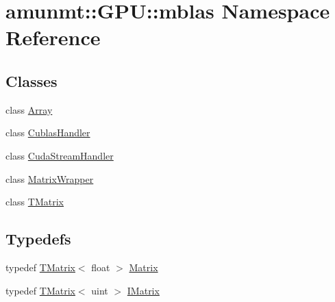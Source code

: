 \hypertarget{namespaceamunmt_1_1GPU_1_1mblas}{}\section{amunmt\+:\+:G\+PU\+:\+:mblas Namespace Reference}
\label{namespaceamunmt_1_1GPU_1_1mblas}
\subsection*{Classes}
\begin{DoxyCompactItemize}
\item 
class \hyperlink{classamunmt_1_1GPU_1_1mblas_1_1Array}{Array}
\item 
class \hyperlink{classamunmt_1_1GPU_1_1mblas_1_1CublasHandler}{Cublas\+Handler}
\item 
class \hyperlink{classamunmt_1_1GPU_1_1mblas_1_1CudaStreamHandler}{Cuda\+Stream\+Handler}
\item 
class \hyperlink{classamunmt_1_1GPU_1_1mblas_1_1MatrixWrapper}{Matrix\+Wrapper}
\item 
class \hyperlink{classamunmt_1_1GPU_1_1mblas_1_1TMatrix}{T\+Matrix}
\end{DoxyCompactItemize}
\subsection*{Typedefs}
\begin{DoxyCompactItemize}
\item 
typedef \hyperlink{classamunmt_1_1GPU_1_1mblas_1_1TMatrix}{T\+Matrix}$<$ float $>$ \hyperlink{namespaceamunmt_1_1GPU_1_1mblas_ab67821a8254de53e45a623cf73c0aef6}{Matrix}
\item 
typedef \hyperlink{classamunmt_1_1GPU_1_1mblas_1_1TMatrix}{T\+Matrix}$<$ uint $>$ \hyperlink{namespaceamunmt_1_1GPU_1_1mblas_ad6a337d269d1833a6028b8871e57d2d0}{I\+Matrix}
\end{DoxyCompactItemize}
